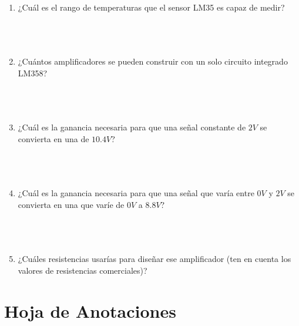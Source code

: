 	\begin{enumerate}
		\item ¿Cuál es el rango de temperaturas que el sensor LM35 es capaz de medir?\\ \\ \\ \\
		\item ¿Cuántos amplificadores se pueden construir con un solo circuito integrado LM358?\\ \\ \\ \\
		\item ¿Cuál es la ganancia necesaria para que una señal constante de $2 V$ se convierta en una de $10.4 V$?\\ \\ \\ \\
		\item ¿Cuál es la ganancia necesaria para que una señal que varía entre $0 V$ y $2 V$ se convierta en una que varíe de $0 V$ a $8.8 V$?\\ \\ \\ \\
		\item ¿Cuáles resistencias usarías para diseñar ese amplificador (ten en cuenta los valores de resistencias comerciales)?\\
	\end{enumerate}


\clearpage
\section{Hoja de Anotaciones}

